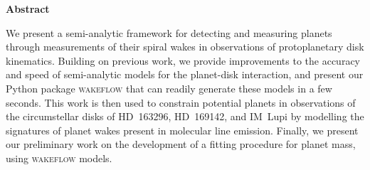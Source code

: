 {}

\begin{center}
    
    {\Large \textbf{Abstract}}
    
\end{center}

\noindent We present a semi-analytic framework for detecting and measuring planets through measurements of their spiral wakes in observations of protoplanetary disk kinematics.
Building on previous work, we provide improvements to the accuracy and speed of semi-analytic models for the planet-disk interaction, and present our Python package \textsc{wakeflow} that can readily generate these models in a few seconds.
This work is then used to constrain potential planets in observations of the circumstellar disks of HD~163296, HD~169142, and IM~Lupi by modelling the signatures of planet wakes present in molecular line emission.
Finally, we present our preliminary work on the development of a fitting procedure for planet mass, using \textsc{wakeflow} models.

\newpage